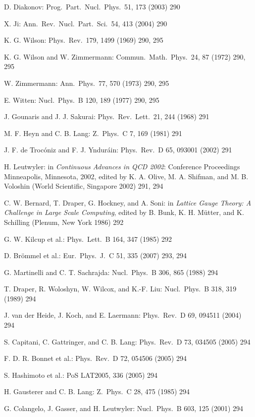 \begin{enumerate}[label={[\arabic*]}]
  \item D. Diakonov: Prog.\ Part.\ Nucl.\ Phys.\ 51, 173 (2003) 290
  \item X. Ji: Ann.\ Rev.\ Nucl.\ Part.\ Sci.\ 54, 413 (2004) 290
  \item K. G. Wilson: Phys.\ Rev.\ 179, 1499 (1969) 290, 295
  \item K. G. Wilson and W. Zimmermann: Commun.\ Math.\ Phys.\ 24, 87 (1972) 290, 295
  \item W. Zimmermann: Ann.\ Phys.\ 77, 570 (1973) 290, 295
  \item E. Witten: Nucl.\ Phys.\ B 120, 189 (1977) 290, 295
  \item J. Gounaris and J. J. Sakurai: Phys.\ Rev.\ Lett.\ 21, 244 (1968) 291
  \item M. F. Heyn and C. B. Lang: Z.\ Phys.\ C 7, 169 (1981) 291
  \item J. F. de Troc\'oniz and F. J. Yndur\'ain: Phys.\ Rev.\ D 65, 093001 (2002) 291
  \item H. Leutwyler: in \emph{Continuous Advances in QCD 2002}: Conference Proceedings Minneapolis, Minnesota, 2002, edited by K. A. Olive, M. A. Shifman, and M. B. Voloshin (World Scientific, Singapore 2002) 291, 294
  \item C. W. Bernard, T. Draper, G. Hockney, and A. Soni: in \emph{Lattice Gauge Theory: A Challenge in Large Scale Computing}, edited by B. Bunk, K. H. M\"utter, and K. Schilling (Plenum, New York 1986) 292
  \item G. W. Kilcup et al.: Phys.\ Lett.\ B 164, 347 (1985) 292
  \item D. Br\"ommel et al.: Eur.\ Phys.\ J.\ C 51, 335 (2007) 293, 294
  \item G. Martinelli and C. T. Sachrajda: Nucl.\ Phys.\ B 306, 865 (1988) 294
  \item T. Draper, R. Woloshyn, W. Wilcox, and K.-F. Liu: Nucl.\ Phys.\ B 318, 319 (1989) 294
  \item J. van der Heide, J. Koch, and E. Laermann: Phys.\ Rev.\ D 69, 094511 (2004) 294
  \item S. Capitani, C. Gattringer, and C. B. Lang: Phys.\ Rev.\ D 73, 034505 (2005) 294
  \item F. D. R. Bonnet et al.: Phys.\ Rev.\ D 72, 054506 (2005) 294
  \item S. Hashimoto et al.: PoS LAT2005, 336 (2005) 294
  \item H. Gausterer and C. B. Lang: Z.\ Phys.\ C 28, 475 (1985) 294
  \item G. Colangelo, J. Gasser, and H. Leutwyler: Nucl.\ Phys.\ B 603, 125 (2001) 294

\end{enumerate}
